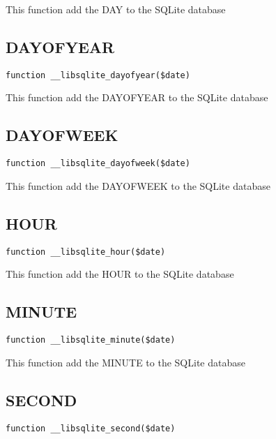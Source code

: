 \documentclass[a4paper]{book}
\begin{document}
This function add the DAY to the SQLite database

\hypertarget{toc304}{}
\subsection{DAYOFYEAR}

\begin{lstlisting}
function __libsqlite_dayofyear($date)
\end{lstlisting}

This function add the DAYOFYEAR to the SQLite database

\hypertarget{toc305}{}
\subsection{DAYOFWEEK}

\begin{lstlisting}
function __libsqlite_dayofweek($date)
\end{lstlisting}

This function add the DAYOFWEEK to the SQLite database

\hypertarget{toc306}{}
\subsection{HOUR}

\begin{lstlisting}
function __libsqlite_hour($date)
\end{lstlisting}

This function add the HOUR to the SQLite database

\hypertarget{toc307}{}
\subsection{MINUTE}

\begin{lstlisting}
function __libsqlite_minute($date)
\end{lstlisting}

This function add the MINUTE to the SQLite database

\hypertarget{toc308}{}
\subsection{SECOND}

\begin{lstlisting}
function __libsqlite_second($date)
\end{lstlisting}
\end{document}
